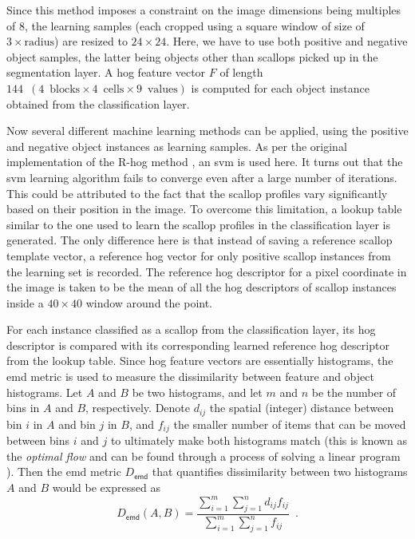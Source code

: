 Since this method imposes a constraint on the image dimensions being multiples of 8, the learning samples (each cropped using a square window of size of $3\times \text{radius}$) are resized to $24\times24$. 
Here, we have to use both positive and negative object samples, the latter being objects other than scallops picked up in the segmentation layer. 
A \gls{hog} feature vector $F$ of length $144\enspace (4\enspace \text{blocks} \times4\enspace \text{cells} \times9\enspace \text{values})$ is computed for each object instance obtained from the classification layer.

Now several different machine learning methods can be applied, using the positive and negative object instances as learning samples. 
As per the original implementation of the \textsc{R-}\gls{hog} method \cite{dalal}, an \gls{svm} is used here. 
It turns out that the \gls{svm} learning algorithm fails to converge even after a large number of iterations. 
This could be attributed to the fact that the scallop profiles  vary significantly based on their position in the image. 
To overcome this limitation, a lookup table similar to the one used to learn the scallop profiles in the classification layer is generated. 
The only difference here is that instead of saving a reference scallop template vector, a reference \gls{hog} vector for only positive scallop instances from the learning set is recorded. 
The reference \gls{hog} descriptor for a pixel coordinate in the image is taken to be the mean of all the \gls{hog} descriptors of scallop instances inside a $40\times40$ window around the point.

For each instance classified as a scallop from the classification layer, its \gls{hog} descriptor is compared with its corresponding learned reference \gls{hog} descriptor from the lookup table.
Since \gls{hog} feature vectors are essentially histograms, the \gls{emd} metric \cite{rubner} is used to measure the dissimilarity between feature and object histograms.
Let $A$ and $B$ be two histograms, and let $m$ and $n$ be the number of bins in $A$ and $B$, respectively.
Denote $d_{ij}$ the spatial (integer) distance between bin $i$ in $A$ and bin $j$ in $B$, and $f_{ij}$ the smaller number of items that can be moved between bins $i$ and $j$ to ultimately make both histograms match (this is known as the \emph{optimal flow} and can be found through a process of solving a linear program \cite{rubner}).
Then the \gls{emd} metric $D_\mathsf{emd}$ that quantifies dissimilarity between two histograms $A$ and $B$ would be expressed as
%
\[
 D_\mathsf{emd}(A,B)=\frac{\sum_{i=1}^m\sum_{j=1}^nd_{ij}f_{ij}}{\sum_{i=1}^m\sum_{j=1}^nf_{ij}} \enspace.
\]


